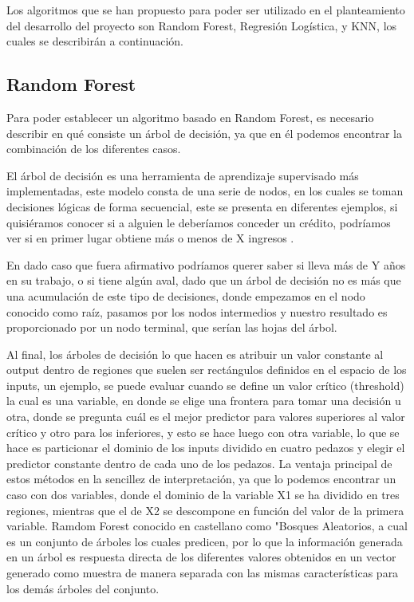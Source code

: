 Los algoritmos que se han propuesto para poder ser utilizado en el planteamiento del desarrollo del proyecto son Random Forest, Regresión Logística, y KNN, los cuales se describirán a continuación.

\subsection{Random Forest}

Para poder establecer un algoritmo basado en Random Forest, es necesario describir en qué consiste un árbol de decisión, ya que en él podemos encontrar la combinación de los diferentes casos.

El árbol de decisión es una herramienta de aprendizaje supervisado más implementadas, este modelo consta de una serie de nodos, en los cuales se toman decisiones lógicas de forma secuencial, este se presenta en diferentes ejemplos, si quisiéramos conocer si a alguien le deberíamos conceder un crédito, podríamos ver si en primer lugar obtiene más o menos de X ingresos \cite{AndresAlbelda}. 

En dado caso que fuera afirmativo podríamos querer saber si lleva más de Y años en su trabajo, o si tiene algún aval, dado que un árbol de decisión no es más que una acumulación de este tipo de decisiones, donde empezamos en el nodo conocido como raíz, pasamos por los nodos intermedios y nuestro resultado es proporcionado por un nodo terminal, que serían las hojas del árbol.

Al final, los árboles de decisión lo que hacen es atribuir un valor constante al output dentro de regiones que suelen ser rectángulos definidos en el espacio de los inputs, un ejemplo, se puede evaluar cuando se define un valor crítico (threshold) la cual es una variable, en donde se elige una frontera para tomar una decisión u otra, donde se pregunta cuál es el mejor predictor para valores superiores al valor crítico y otro para los inferiores, y esto se hace luego con otra variable, lo que se hace es particionar el dominio de los inputs dividido en cuatro pedazos y elegir el predictor constante dentro de cada uno de los pedazos. 
La ventaja principal de estos métodos en la sencillez de interpretación, ya que lo podemos encontrar un caso con dos variables, donde el dominio de la variable X1 se ha dividido en tres regiones, mientras que el de X2 se descompone en función del valor de la primera variable.
Ramdom Forest conocido en castellano como "Bosques Aleatorios, a cual es un conjunto de árboles los cuales predicen, por lo que la información generada en un árbol es respuesta directa de los diferentes valores obtenidos en un vector generado como muestra de manera separada con las mismas características para los demás árboles del conjunto.

